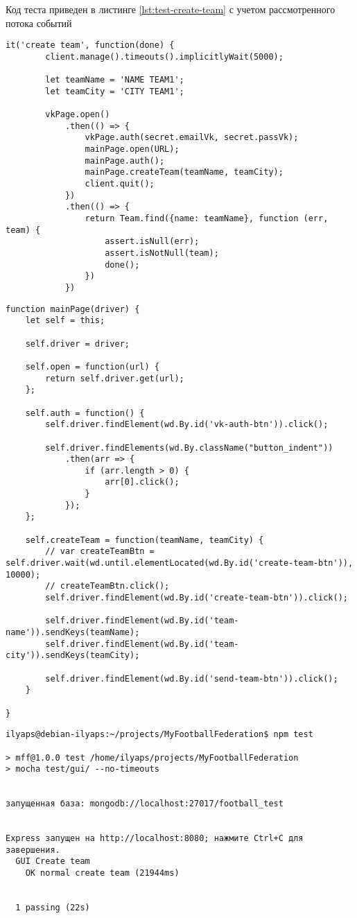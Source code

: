 Код теста приведен в листинге \ref{lst:test-create-team} с учетом рассмотренного потока событий  

\begin{lstlisting}[caption={Тестирование use case создание команды}, label={lst:test-create-team}]
it('create team', function(done) {
        client.manage().timeouts().implicitlyWait(5000);

        let teamName = 'NAME TEAM1';
        let teamCity = 'CITY TEAM1';

        vkPage.open()
            .then(() => {
                vkPage.auth(secret.emailVk, secret.passVk);
                mainPage.open(URL);
                mainPage.auth();
                mainPage.createTeam(teamName, teamCity);
                client.quit();
            })
            .then(() => {
                return Team.find({name: teamName}, function (err, team) {
                    assert.isNull(err);
                    assert.isNotNull(team);
                    done();
                })
            })
\end{lstlisting} 

\begin{lstlisting}[caption={Объект mainPage}]
function mainPage(driver) {
    let self = this;

    self.driver = driver;

    self.open = function(url) {
        return self.driver.get(url);
    };

    self.auth = function() {
        self.driver.findElement(wd.By.id('vk-auth-btn')).click();

        self.driver.findElements(wd.By.className("button_indent"))
            .then(arr => {
                if (arr.length > 0) {
                    arr[0].click();
                }
            });
    };

    self.createTeam = function(teamName, teamCity) {
        // var createTeamBtn = self.driver.wait(wd.until.elementLocated(wd.By.id('create-team-btn')), 10000);
        // createTeamBtn.click();
        self.driver.findElement(wd.By.id('create-team-btn')).click();

        self.driver.findElement(wd.By.id('team-name')).sendKeys(teamName);
        self.driver.findElement(wd.By.id('team-city')).sendKeys(teamCity);

        self.driver.findElement(wd.By.id('send-team-btn')).click();
    }

}
\end{lstlisting} 

\begin{lstlisting}[caption={Результаты тестирования}]
ilyaps@debian-ilyaps:~/projects/MyFootballFederation$ npm test

> mff@1.0.0 test /home/ilyaps/projects/MyFootballFederation
> mocha test/gui/ --no-timeouts


запущенная база: mongodb://localhost:27017/football_test


Express запущен на http://localhost:8080; нажмите Ctrl+C для завершения.
  GUI Create team
    ОК normal create team (21944ms)


  1 passing (22s)
\end{lstlisting} 


